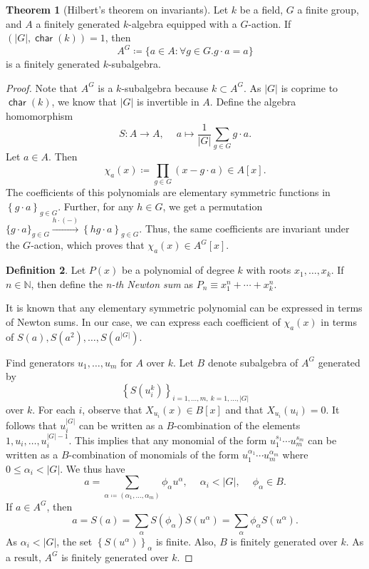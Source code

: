 \documentclass[10pt,letterpaper,cm]{nupset}
\theoremstyle{definition}
\newtheorem{definition}{Definition}[subsection]
\theoremstyle{theorem}
\newtheorem{theorem}[definition]{Theorem}
\theoremstyle{remark}
\newcommand{\N}{\mathbb N}
\newcommand{\1}{\mathbf{1}}
\newcommand{\0}{\vec 0}
\DeclareMathOperator{\Char}{\mathsf{char}}
\begin{document}
\begin{theorem}[Hilbert's theorem on invariants]
Let $k$ be a field, $G$ a finite group, and $A$ a finitely generated $k$-algebra equipped with a $G$-action. If $\left(\lvert{G}\rvert, \Char(k)\right)=1$, then $$A^G\coloneqq  \{ a \in A: \forall g \in G.g\cdot a =a\}$$ is a finitely generated $k$-subalgebra. 
\end{theorem}
\begin{proof}
Note that $A^G$ is a $k$-subalgebra because $k\subset A^G$. As $\lvert{G}\rvert$ is coprime to $\Char(k)$, we know that $\lvert{G}\rvert$ is invertible in $A$. Define the algebra homomorphism $$S: A \to A,\ \quad a \mapsto \frac{1}{\lvert{G}\rvert}\sum_{g\in G}g\cdot a   .$$ Let $a\in A$. Then $$\chi_a(x)\coloneqq  \prod_{g\in G}(x-g\cdot a)\in A[x].$$ The coefficients of this polynomials are elementary symmetric functions in $\left\{g\cdot a\right\}_{g\in G}$. Further, for any $h\in G$, we get a permutation $\{g\cdot a\}_{g\in G} \overset{h\cdot (-)}{\longrightarrow} \left\{h g\cdot a\right\}_{g\in G}$. Thus, the same coefficients are invariant under the $G$-action, which proves that $\chi_a(x) \in A^G[x]$. 
\begin{definition}
Let $P(x)$ be a polynomial of degree $k$ with roots $x_1, \ldots, x_k$. If $n\in \N$, then define the \textit{n-th Newton sum} as $P_n \equiv x_1^n + \cdots + x_k^n$.
\end{definition}
It is known that any elementary symmetric polynomial can be expressed in terms of Newton sums. In our case, we can express each coefficient of $\chi_a(x)$ in terms of $S(a), S(a^2) , \ldots, S\left(a^{\lvert{G}\rvert}\right)$.

Find generators $u_1, \ldots, u_m$ for $A$ over $k$. Let $B$ denote subalgebra of $A^G$ generated by $$\left\{S\left(u_i^k\right)\right\}_{i=1, \ldots, m,\ k=1, \ldots, \lvert{G}\rvert}$$ over $k$. For each $i$, observe that $X_{u_i}(x) \in B[x]$ and that $X_{u_i}(u_i) =0$. It follows that $u_i^{\lvert{G}\rvert}$ can be written as a $B$-combination of the elements $1, u_i, \ldots, u_i^{\lvert{G}\rvert-1}$. This implies that any monomial of the form $u_1^{s_1}\cdots u_m^{s_m}$ can be written as a $B$-combination of monomials of the form $u_1^{\alpha_1}\cdots u_m^{\alpha_m}$ where $0\leq \alpha_i <\lvert{G}\rvert$. We thus have $$a= \sum_{\alpha\coloneqq  (\alpha_1, \ldots, \alpha_m)}\phi_{\alpha}u^{\alpha},\ \quad \alpha_i < \lvert{G}\rvert,\ \quad \phi_{\alpha} \in B.   $$ If $a\in A^G$, then $$a=S(a) = \sum_{\alpha}S(\phi_{\alpha})S(u^{\alpha}) = \sum_{\alpha} \phi_{\alpha}S(u^{\alpha}).$$ As  $\alpha_i<\lvert{G}\rvert$,  the set $\left\{S(u^{\alpha})\right\}_{\alpha}$ is finite. Also, $B$ is finitely generated over $k$. As a result, $A^G$ is finitely generated over $k$. 
\end{proof}
\end{document}
